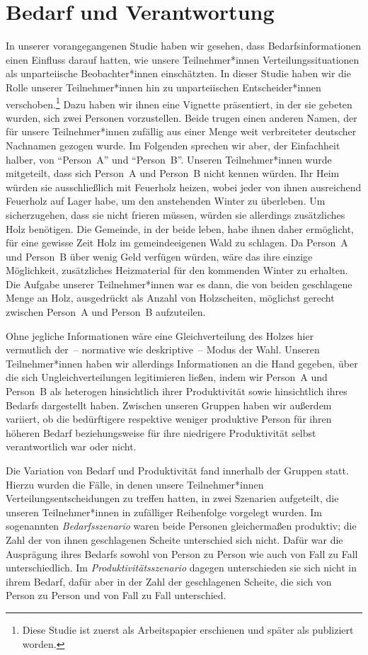 \documentclass[justified,nobib,nohyper,symmetric,twoside]{tufte-book}
\begin{document}
\chapter{Bedarf und Verantwortung}\label{ch:verantwortung}
In unserer vorangegangenen Studie haben wir gesehen, dass Bedarfs\-informationen einen Einfluss darauf hatten, wie unsere Teilnehmer*innen Verteilungssituationen als unparteiische Beobachter*innen einschätzten.
In dieser Studie haben wir die Rolle unserer Teilnehmer*innen hin zu unparteiischen Entscheider*innen verschoben.\footnote{Diese Studie ist zuerst als Arbeitspapier erschienen \citep{bauer_need_2020} und später als \citet{bauer_need_2022} publiziert worden.}
Dazu haben wir ihnen eine Vignette präsentiert, in der sie gebeten wurden, sich zwei Personen vorzustellen.
Beide trugen einen anderen Namen, der für unsere Teilnehmer*innen zufällig aus einer Menge weit verbreiteter deutscher Nachnamen gezogen wurde.
Im Folgenden sprechen wir aber, der Einfachheit halber, von \enquote{Person~A} und \enquote{Person~B}.
Unseren Teilnehmer*innen wurde mitgeteilt, dass sich Person~A und Person~B nicht kennen würden.
Ihr Heim würden sie ausschließlich mit Feuerholz heizen, wobei jeder von ihnen ausreichend Feuerholz auf Lager habe, um den anstehenden Winter zu überleben.
Um sicherzugehen, dass sie nicht frieren müssen, würden sie allerdings zusätzliches Holz benötigen.
Die Gemeinde, in der beide leben, habe ihnen daher ermöglicht, für eine gewisse Zeit Holz im gemeindeeigenen Wald zu schlagen.
Da Person~A und Person~B über wenig Geld verfügen würden, wäre das ihre einzige Möglichkeit, zusätzliches Heizmaterial für den kommenden Winter zu erhalten.
Die Aufgabe unserer Teilnehmer*innen war es dann, die von beiden geschlagene Menge an Holz, ausgedrückt als Anzahl von Holzscheiten, möglichst gerecht zwischen Person~A und Person~B aufzuteilen.

Ohne jegliche Informationen wäre eine Gleichverteilung des Holzes hier vermutlich der~-- normative wie deskriptive~-- Modus der Wahl.
Unseren Teilnehmer*innen haben wir allerdings Informationen an die Hand gegeben, über die sich Ungleichverteilungen legitimieren ließen, indem wir Person~A und Person~B als heterogen hinsichtlich ihrer Produktivität sowie hinsichtlich ihres Bedarfs dargestellt haben.
Zwischen unseren Gruppen haben wir außerdem variiert, ob die bedürftigere respektive weniger produktive Person für ihren höheren Bedarf beziehungsweise für ihre niedrigere Produktivität selbst verantwortlich war oder nicht.

Die Variation von Bedarf und Produktivität fand innerhalb der Gruppen statt.
Hierzu wurden die Fälle, in denen unsere Teilnehmer*innen Verteilungsentscheidungen zu treffen hatten, in zwei Szenarien aufgeteilt, die unseren Teilnehmer*innen in zufälliger Reihenfolge vorgelegt wurden.
Im sogenannten \textit{Bedarfsszenario} waren beide Personen gleichermaßen produktiv; die Zahl der von ihnen geschlagenen Scheite unterschied sich nicht.
Dafür war die Ausprägung ihres Bedarfs sowohl von Person zu Person wie auch von Fall zu Fall unterschiedlich.
Im \textit{Produktivitätsszenario} dagegen unterschieden sie sich nicht in ihrem Bedarf, dafür aber in der Zahl der geschlagenen Scheite, die sich von Person zu Person und von Fall zu Fall unterschied.
\end{document}
